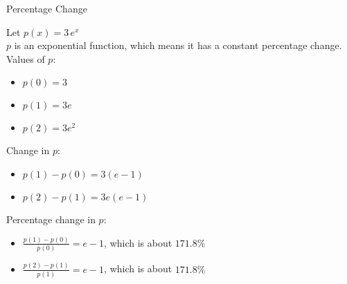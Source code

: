 \documentclass{ximera}
\begin{document}
\begin{example} Percentage Change



Let $p(x) = 3 \, e^x$ \\

$p$ is an exponential function, which means it has a constant percentage change. \\

Values of $p$:

\begin{itemize}
\item $p(0) = 3$

\item $p(1) = 3 e$

\item $p(2) = 3 e^2$
\end{itemize}



Change in $p$:

\begin{itemize}
\item $p(1) - p(0) = 3 (e-1)$

\item $p(2) - p(1) = 3 e (e-1)$

\end{itemize}





Percentage change in $p$:

\begin{itemize}
\item $\frac{p(1) - p(0)}{p(0)} = e - 1$, which is about $171.8\%$

\item $\frac{p(2) - p(1)}{p(1)} = e-1 $, which is about $171.8\%$

\end{itemize}


\end{example}
\end{document}
